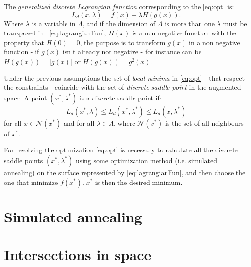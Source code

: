 \documentclass[dissertation.tex]{subfiles}
\begin{document}
The \emph{generalized discrete Lagrangian
  function} corresponding to the \cref{eq:opt} is:
\begin{equation}\label{eq:lagrangianFun}
  L_d(x,\lambda)=f(x)+\lambda H(g(x)).
\end{equation}
Where $\lambda$ is a variable in $\Lambda$, and if the dimension of
$\Lambda$ is more than one $\lambda$ must be transposed in
~\cref{eq:lagrangianFun}; $H(x)$ is a non negative function
with the property that $H(0)=0$, the purpose is to transform $g(x)$ in
a non negative function - if $g(x)$ isn't already not negative - for
instance can be $H(g(x))=|g(x)|$ or $H(g(x))=g^2(x)$.

Under the previous assumptions the set of \emph{local minima}
in \cref{eq:opt} - that respect the constraints -  coincide
with the set of \emph{discrete saddle point}
in the augmented space. A point $(x^*,\lambda^*)$ is a discrete saddle
point if:
\begin{equation*}
  L_d(x^*,\lambda)\leq L_d(x^*,\lambda^*)\leq L_d(x,\lambda^*)
\end{equation*}
for all $x\in\mathcal{N}(x^*)$ and for all $\lambda\in\Lambda$, where
$\mathcal{N}(x^*)$ is the set of all neighbours of $x^*$.

For resolving the optimization \cref{eq:opt} is necessary to
calculate all the discrete saddle points $(x^*,\lambda^*)$ using some
optimization method (i.e. simulated annealing) on the surface
represented by
\cref{eq:lagrangianFun}, and then choose
the one that minimize $f(x^*)$. $x^*$ is then the desired minimum.

\section{Simulated annealing}

\section{Intersections in space}\label{sec:intersections}
\end{document}
